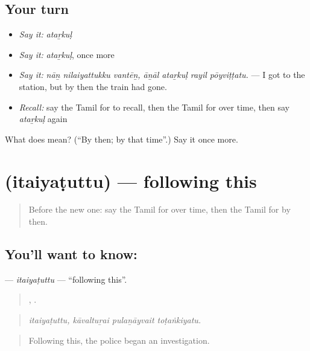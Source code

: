 \subsection*{Your turn}
\begin{itemize}
\raggedright
  \item \emph{Say it:} \emph{ataṟkuḷ}
  \item \emph{Say it:} \emph{ataṟkuḷ}, once more
  \item \emph{Say it:} \emph{nāṉ nilaiyattukku vantēṉ, āṉāl ataṟkuḷ rayil pōyviṭṭatu.} — I got to the station, but by then the train had gone.
  \item \emph{Recall:} say the Tamil for to recall, then the Tamil for over time, then say \emph{ataṟkuḷ} again
\end{itemize}

\begin{tcolorbox}[breakable,colback=teal!4,colframe=teal!35!black,title={Before you move on}]
What does  mean? (\textquotedblleft{}By then; by that time\textquotedblright{}.) Say it once more.
\end{tcolorbox}
\section[\texorpdfstring{\ta{இதையடுத்து} (itaiyaṭuttu)}{இதையடுத்து (itaiyaṭuttu)}]{ (itaiyaṭuttu) — following this}

\label{lesson:TA-C314-itaiyatuttu}



\begin{quote}
Before the new one: say the Tamil for over time, then the Tamil for by then.
\end{quote}

\subsection*{You'll want to know: }
\textbf{} — \emph{itaiyaṭuttu} — \textquotedblleft{}following this\textquotedblright{}.

\begin{quote}
,   .
\end{quote}

\begin{quote}
\emph{itaiyaṭuttu, kāvaltuṟai pulaṉāyvait toṭaṅkiyatu.}
\end{quote}

\begin{quote}
Following this, the police began an investigation.
\end{quote}


